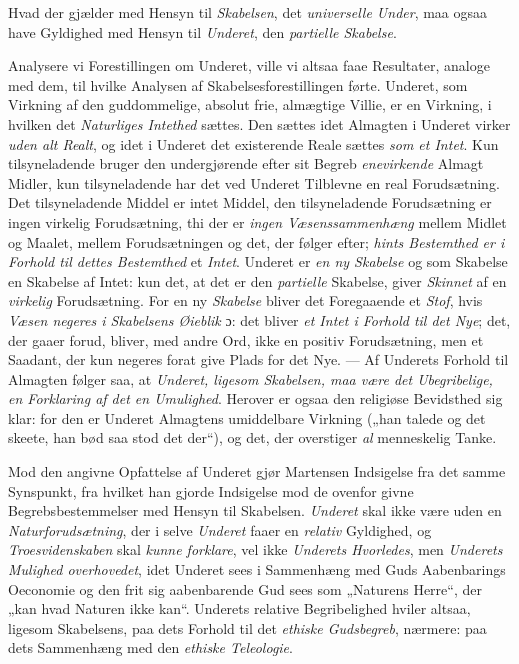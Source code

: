\documentclass[12pt,a4paper]{book}
\newcommand{\opage}[1]{\marginnote{\footnotesize\textit{[#1]}}}
\begin{document}
\opage{79}Hvad der gjælder med Hensyn til \emph{Skabelsen}, det \emph{universelle Under}, maa ogsaa
have Gyldighed med Hensyn til \emph{Underet}, den \emph{partielle Skabelse}.

Analysere vi Forestillingen om Underet, ville vi altsaa faae Resultater, analoge med
dem, til hvilke Analysen af Skabelsesforestillingen førte. Underet, som Virkning af
den guddommelige, absolut frie, almægtige Villie, er en Virkning, i hvilken det
\emph{Naturliges Intethed} sættes. Den sættes idet Almagten i Underet virker \emph{uden alt Realt}, og idet i Underet det existerende Reale sættes \emph{som et Intet}. Kun tilsyneladende
bruger den undergjørende efter sit Begreb \emph{enevirkende} Almagt Midler, kun
tilsyneladende har det ved Underet Tilblevne en real Forudsætning. Det tilsyneladende
Middel er intet Middel, den tilsyneladende Forudsætning er ingen virkelig
Forudsætning, thi der er \emph{ingen Væsenssammenhæng} mellem Midlet og Maalet, mellem
Forudsætningen og det, der følger efter; \emph{hints Bestemthed er i Forhold til dettes Bestemthed} et \emph{Intet}. Underet er \emph{en ny Skabelse} og som Skabelse en Skabelse af Intet:
kun det, at det er den \emph{partielle} Skabelse, giver \emph{Skinnet} af en \emph{virkelig} Forudsætning.
For en ny \emph{Skabelse} bliver det Foregaaende et \emph{Stof}, hvis \emph{Væsen negeres i Skabelsens Øieblik} ɔ: det bliver \emph{et Intet i Forhold til det Nye}; det, der gaaer forud, bliver,
med andre Ord, ikke en positiv Forudsætning, men et Saadant, der kun negeres forat
give Plads for det Nye. --- Af Underets Forhold til Almagten følger saa, at \emph{Underet, ligesom Skabelsen, maa være det Ubegribelige, en Forklaring af det en Umulighed}.
Herover er ogsaa den religiøse Bevidsthed sig klar: for den er Underet Almagtens
umiddelbare Virkning („han talede og det skeete, han bød saa stod det der“), og det, der
overstiger \emph{al} menneskelig Tanke.

\opage{80}Mod den angivne Opfattelse af Underet gjør Martensen Indsigelse fra det samme
Synspunkt, fra hvilket han gjorde Indsigelse mod de ovenfor givne
Begrebsbestemmelser med Hensyn til Skabelsen. \emph{Underet} skal ikke være uden en \emph{Naturforudsætning}, der i selve \emph{Underet} faaer en \emph{relativ} Gyldighed, og \emph{Troesvidenskaben} skal \emph{kunne forklare}, vel ikke \emph{Underets Hvorledes}, men \emph{Underets Mulighed overhovedet}, idet Underet sees i Sammenhæng med Guds Aabenbarings
Oeconomie og den frit sig aabenbarende Gud sees som „Naturens Herre“, der „kan
hvad Naturen ikke kan“. Underets relative Begribelighed hviler altsaa, ligesom
Skabelsens, paa dets Forhold til det \emph{ethiske Gudsbegreb}, nærmere: paa dets
Sammenhæng med den \emph{ethiske Teleologie}.
\end{document}
